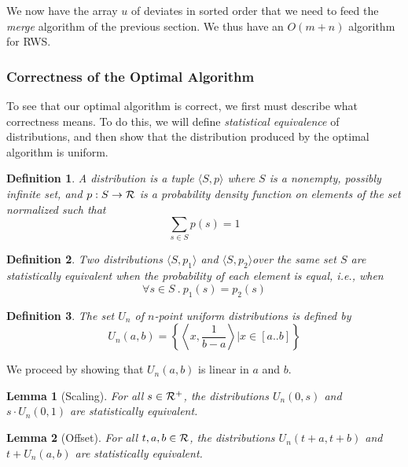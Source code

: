 \documentclass[12pt]{article}
\newtheorem{definition}{Definition}
\newtheorem{lemma}{Lemma}
\begin{document}
  We now have the array $u$ of deviates in sorted order that
  we need to feed the {\em merge} algorithm of the previous
  section.  We thus have an $O(m + n)$ algorithm for RWS.

\subsubsection{Correctness of the Optimal Algorithm}

  To see that our optimal algorithm is correct, we first
  must describe what correctness means.  To do this, we will
  define {\em statistical equivalence} of distributions, and
  then show that the distribution produced by the optimal
  algorithm is uniform.

  \begin{definition}
    A {\em distribution} is a tuple $\langle S, p\rangle$
    where $S$ is a nonempty, possibly infinite set, and $p : S
    \rightarrow \cal{R}$ is a probability density function on
    elements of the set normalized such that $$
      \sum_{s \in S}{p(s)} = 1
    $$
  \end{definition}

  \begin{definition}
    Two distributions $\langle S, p_1\rangle$ and $\langle
    S, p_2\rangle$over the same set $S$ are {\em
    statistically equivalent} when the probability of each
    element is equal, {\em i.e.,} when $$
      \forall s \in S~.~p_1(s) = p_2(s)
    $$
  \end{definition}

  \begin{definition}
    The set $U_n$ of {\em $n$-point uniform
    distributions} is defined by $$
      U_n(a,b) = \left\{ \left\langle x, \frac{1}{b - a}\right\rangle \big| x \in [a..b]\right\}
    $$
  \end{definition}

  We proceed by showing that $U_n(a,b)$ is linear in $a$ and $b$.

  \begin{lemma}[Scaling]
    For all $s \in \cal{R}^{+}$, the distributions
    $U_n(0, s)$ and $s \cdot U_n(0, 1)$ are statistically equivalent.
  \end{lemma}

  \begin{lemma}[Offset]
    For all $t, a, b \in \cal{R}$, the distributions
    $U_n(t + a, t + b)$ and $t + U_n(a, b)$ are statistically equivalent.
  \end{lemma}
\end{document}
